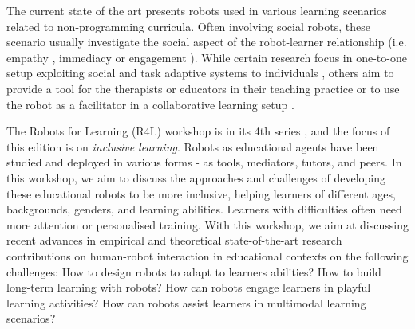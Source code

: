\documentclass{sig-alternate-05-2015}
\begin{document}
The current state of the art presents robots used in various learning scenarios related to non-programming curricula. 
Often involving social robots, these scenario usually investigate the social aspect of the robot-learner relationship (i.e. empathy \cite{leite2014empathic}, immediacy \cite{kennedy2016social} or engagement \cite{lemaignan2016,castellano2013towards}).
While certain research focus in one-to-one setup exploiting social and task adaptive systems to individuals \cite{park2017telling}, others aim to provide a tool for the therapists or educators in their teaching practice or to use the robot as a facilitator in a collaborative learning setup \cite{Ozgur:2017:CVH:2909824.3020247}. 


The Robots for Learning (R4L) workshop is in its 4th series \cite{Johal2017_R4L}, and the focus of this edition is on \emph{inclusive learning}. 
Robots as educational agents have been studied and deployed in various forms - as tools, mediators, tutors, and peers. 
In this workshop, we aim to discuss the approaches and challenges of developing these educational robots to be more inclusive, helping learners of different ages, backgrounds, genders, and learning abilities. 
Learners with difficulties often need more attention or personalised training. 
With this workshop, we aim at discussing recent advances in empirical and theoretical state-of-the-art research contributions on human-robot interaction in educational contexts on the following challenges:  How to design robots to adapt to learners abilities? How to build long-term learning with robots? How can robots engage learners in playful learning activities? How can robots assist learners in multimodal learning scenarios?

%
%
%
%
%
%
%
%
\end{document}
